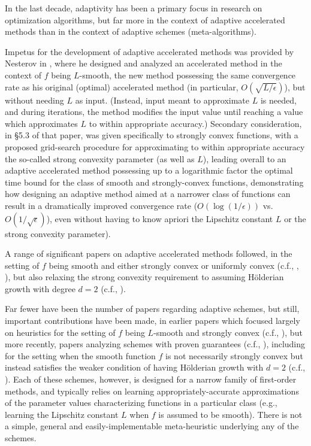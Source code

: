 \documentclass[reqno, 11pt]{amsart}
\numberwithin{equation}{section}
\begin{document}
In the last decade, adaptivity has been a primary focus in research on optimization algorithms, but far more in the context of adaptive accelerated methods than in the context  of adaptive schemes (meta-algorithms). 

Impetus for the development of adaptive accelerated methods was provided by Nesterov in  \cite{nesterov2013gradient}, where he designed and analyzed an  accelerated method in the context of $ f $ being $ L $-smooth, the new method possessing the same convergence rate as his original (optimal) accelerated method (in particular, $ O(\sqrt{L/\epsilon}) $), but without needing $ L $ as input. (Instead, input meant to approximate $ L $ is needed, and during iterations, the method modifies the input value until reaching a value which approximates $ L $ to within appropriate accuracy.)  Secondary consideration, in \S5.3 of that paper, was given specifically to strongly convex functions, with a proposed grid-search procedure for approximating to within appropriate accuracy the so-called strong convexity parameter (as well as $ L $), leading overall to an adaptive accelerated method possessing up to a logarithmic factor the optimal time bound for the class of smooth and strongly-convex functions, demonstrating how designing an adaptive method aimed at a narrower class of functions can result in a dramatically improved convergence rate ($ O(\log(1/\epsilon)) $ vs. $ O(1/ \sqrt{\epsilon}) $), even without having to know apriori the Lipschitz constant $ L $ or the strong convexity parameter). 

A range of significant papers on adaptive accelerated methods followed, in the setting of $ f $ being smooth and either strongly convex or uniformly convex (c.f., \cite{juditsky2014primal}, \cite{lin2014adaptive}), but also relaxing the strong convexity requirement to assuming  H\"{o}lderian growth with degree $ d = 2 $ (c.f., \cite{necoara2016linear}). 

Far fewer have been the number of papers regarding adaptive schemes, but still, important contributions have been made, in earlier papers which focused largely on  heuristics for the 
  setting of $ f $ being $ L $-smooth and strongly convex (c.f., 
 \cite{o2015adaptive,giselsson2014monotonicity,fercoq2016restarting}), but more recently, papers analyzing schemes with proven guarantees (c.f., \cite{fercoq2016restarting}), including for the setting when the smooth function $ f $ is not necessarily strongly convex but instead satisfies the weaker condition of having H\"{o}lderian growth with $ d = 2 $ (c.f., \cite{fercoq2019adaptive}). Each of these schemes, however, is designed for a narrow family of first-order methods, and typically relies on learning appropriately-accurate approximations of the parameter values characterizing functions in a particular class (e.g., learning the Lipschitz constant $ L $  when $ f $ is assumed to be smooth). There is not a simple, general and easily-implementable meta-heuristic  underlying any of the schemes.
 
\end{document}
